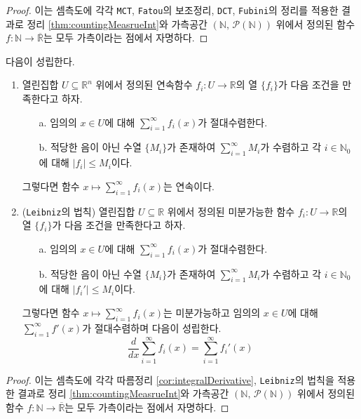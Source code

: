 \begin{proof}
    이는 셈측도에 각각 \texttt{MCT}, \texttt{Fatou}의 보조정리, \texttt{DCT}, \texttt{Fubini}의 정리를 적용한 결과로 정리 \ref{thm:countingMeasrueInt}와 가측공간 $(\mathbb{N},\,\mathcal{P}(\mathbb{N}))$ 위에서 정의된 함수 $f:\mathbb{N}\to\overline{\mathbb{R}}$는 모두 가측이라는 점에서 자명하다.
\end{proof}

\begin{corollary}
    다음이 성립한다.
    \begin{enumerate}
        \item 열린집합 $U\subseteq\mathbb{R}^n$ 위에서 정의된 연속함수 $f_i:U\to\mathbb{R}$의 열 $\{f_i\}$가 다음 조건을 만족한다고 하자.
        \begin{enumerate}
            \item[a.] 임의의 $x\in U$에 대해 $\sum_{i=1}^\infty f_i(x)$가 절대수렴한다.
            \item[b.] 적당한 음이 아닌 수열 $\{M_i\}$가 존재하여 $\sum_{i=1}^\infty M_i$가 수렴하고 각 $i\in\mathbb{N}_0$에 대해 $|f_i|\leq M_i$이다.
        \end{enumerate}
        그렇다면 함수 $x\mapsto\sum_{i=1}^\infty f_i(x)$는 연속이다.
        \item (\texttt{Leibniz}의 법칙) 열린집합 $U\subseteq\mathbb{R}$ 위에서 정의된 미분가능한 함수 $f_i:U\to\mathbb{R}$의 열 $\{f_i\}$가 다음 조건을 만족한다고 하자.
        \begin{enumerate}
            \item[a.] 임의의 $x\in U$에 대해 $\sum_{i=1}^\infty f_i(x)$가 절대수렴한다.
            \item[b.] 적당한 음이 아닌 수열 $\{M_i\}$가 존재하여 $\sum_{i=1}^\infty M_i$가 수렴하고 각 $i\in\mathbb{N}_0$에 대해 $|f_i'|\leq M_i$이다.
        \end{enumerate}
        그렇다면 함수 $x\mapsto\sum_{i=1}^\infty f_i(x)$는 미분가능하고 임의의 $x\in U$에 대해 $\sum_{i=1}^\infty f'(x)$가 절대수렴하며 다음이 성립한다.
        \begin{equation*}
            \frac{d}{dx}\sum_{i=1}^\infty f_i(x)=\sum_{i=1}^\infty f_i'(x)
        \end{equation*}
    \end{enumerate}
\end{corollary}

\begin{proof}
    이는 셈측도에 각각 따름정리 \ref{cor:integralDerivative}, \texttt{Leibniz}의 법칙을 적용한 결과로 정리 \ref{thm:countingMeasrueInt}와 가측공간 $(\mathbb{N},\,\mathcal{P}(\mathbb{N}))$ 위에서 정의된 함수 $f:\mathbb{N}\to\overline{\mathbb{R}}$는 모두 가측이라는 점에서 자명하다.
\end{proof}

